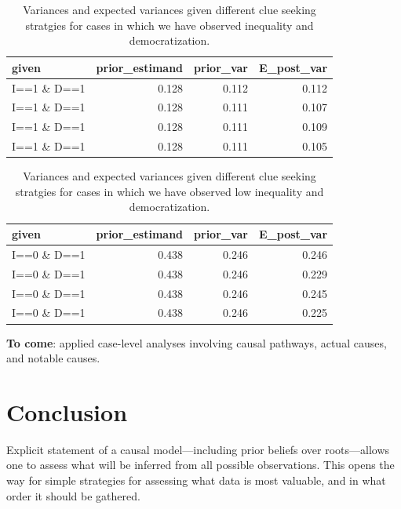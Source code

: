 \documentclass[12pt,]{book}
\begin{document}
\begin{table}[t]

\caption{\label{tab:unnamed-chunk-81}\label{CaseLearn}Variances and expected variances given different  clue seeking  stratgies for cases in which we have observed inequality and democratization.}
\centering
\begin{tabular}{l|r|r|r}
\hline
given & prior\_estimand & prior\_var & E\_post\_var\\
\hline
I==1 \& D==1 & 0.128 & 0.112 & 0.112\\
\hline
I==1 \& D==1 & 0.128 & 0.111 & 0.107\\
\hline
I==1 \& D==1 & 0.128 & 0.111 & 0.109\\
\hline
I==1 \& D==1 & 0.128 & 0.111 & 0.105\\
\hline
\end{tabular}
\end{table}

\begin{table}[t]

\caption{\label{tab:unnamed-chunk-82}\label{CaseLearn}Variances and expected variances given different  clue seeking  stratgies for cases in which we have observed low inequality and democratization.}
\centering
\begin{tabular}{l|r|r|r}
\hline
given & prior\_estimand & prior\_var & E\_post\_var\\
\hline
I==0 \& D==1 & 0.438 & 0.246 & 0.246\\
\hline
I==0 \& D==1 & 0.438 & 0.246 & 0.229\\
\hline
I==0 \& D==1 & 0.438 & 0.246 & 0.245\\
\hline
I==0 \& D==1 & 0.438 & 0.246 & 0.225\\
\hline
\end{tabular}
\end{table}

\textbf{To come}: applied case-level analyses involving causal pathways, actual causes, and notable causes.

\hypertarget{conclusion-2}{%
\section{Conclusion}\label{conclusion-2}}

Explicit statement of a causal model---including prior beliefs over roots---allows one to assess what will be inferred from all possible observations. This opens the way for simple strategies for assessing what data is most valuable, and in what order it should be gathered.
\end{document}
